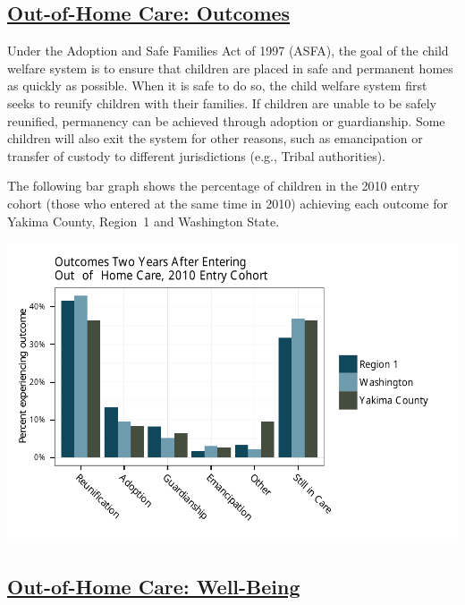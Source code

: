 \documentclass{article}\usepackage[]{graphicx}\usepackage[]{color}
\makeatletter
\def\maxwidth{ %
  \ifdim\Gin@nat@width>\linewidth
    \linewidth
  \else
    \Gin@nat@width
  \fi
}
\newenvironment{knitrout}{}{} %
\makeatother
\begin{document}
\subsection{\href{http://www.partnersforourchildren.org/child-well-being/visualizations/out-home-care/outcomes}
    {Out-of-Home Care: Outcomes}
}
Under the Adoption and Safe Families Act of 1997 (ASFA), the goal of the child welfare system is to ensure that children are placed in safe and permanent homes as quickly as possible. When it is safe to do so, the child welfare system first seeks to reunify children with their families. If children are unable to be safely reunified, permanency can be achieved through adoption or guardianship. Some children will also exit the system for other reasons, such as emancipation or transfer of custody to different jurisdictions (e.g., Tribal authorities).

The following bar graph shows the percentage of children in the 2010 entry cohort (those who entered at the same time in 2010) achieving each outcome for Yakima County, Region~1 and Washington State.
\nopagebreak[3]
\begin{knitrout}
\color{fgcolor}

{\centering \includegraphics[width=\maxwidth]{figure/ooh_outcomes} 

}



\end{knitrout}


\newpage

\subsection{\href{http://www.partnersforourchildren.org/child-well-being/visualizations/out-home-care/well-being}
    {Out-of-Home Care: Well-Being}
}
\end{document}
